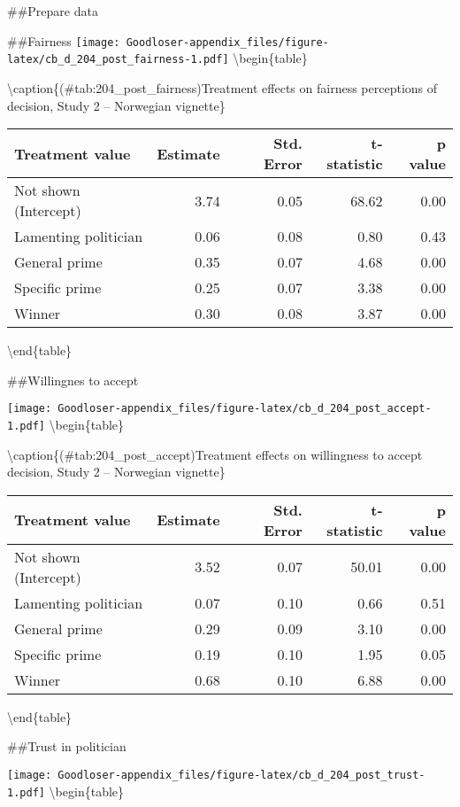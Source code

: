 \documentclass[
]{book}
\begin{document}
\#\#Prepare data

\#\#Fairness
\texttt{[image: Goodloser-appendix\_files/figure-latex/cb\_d\_204\_post\_fairness-1.pdf]} \textbackslash begin\{table\}

\textbackslash caption\{(\#tab:204\_post\_fairness)Treatment effects on fairness perceptions of decision, Study 2 -- Norwegian vignette\}
\centering

\begin{tabular}[t]{lrrrr}
\toprule
Treatment value & Estimate & Std. Error & t-statistic & p value\\
\midrule
Not shown (Intercept) & 3.74 & 0.05 & 68.62 & 0.00\\
Lamenting politician & 0.06 & 0.08 & 0.80 & 0.43\\
General prime & 0.35 & 0.07 & 4.68 & 0.00\\
Specific prime & 0.25 & 0.07 & 3.38 & 0.00\\
Winner & 0.30 & 0.08 & 3.87 & 0.00\\
\bottomrule
\end{tabular}

\textbackslash end\{table\}

\#\#Willingnes to accept

\texttt{[image: Goodloser-appendix\_files/figure-latex/cb\_d\_204\_post\_accept-1.pdf]} \textbackslash begin\{table\}

\textbackslash caption\{(\#tab:204\_post\_accept)Treatment effects on willingness to accept decision, Study 2 -- Norwegian vignette\}
\centering

\begin{tabular}[t]{lrrrr}
\toprule
Treatment value & Estimate & Std. Error & t-statistic & p value\\
\midrule
Not shown (Intercept) & 3.52 & 0.07 & 50.01 & 0.00\\
Lamenting politician & 0.07 & 0.10 & 0.66 & 0.51\\
General prime & 0.29 & 0.09 & 3.10 & 0.00\\
Specific prime & 0.19 & 0.10 & 1.95 & 0.05\\
Winner & 0.68 & 0.10 & 6.88 & 0.00\\
\bottomrule
\end{tabular}

\textbackslash end\{table\}

\#\#Trust in politician

\texttt{[image: Goodloser-appendix\_files/figure-latex/cb\_d\_204\_post\_trust-1.pdf]} \textbackslash begin\{table\}
\end{document}
